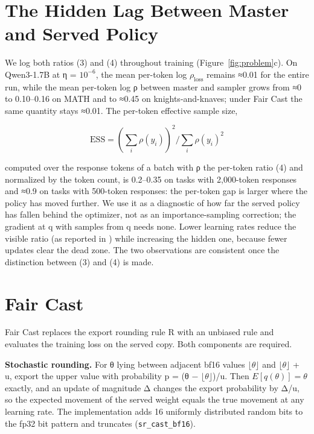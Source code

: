\documentclass[
  10pt,
]{article}
\begin{document}
\section{The Hidden Lag Between Master and Served
Policy}\label{the-hidden-lag-between-master-and-served-policy}

We log both ratios (3) and (4) throughout training (Figure~\ref{fig:problem}c). On Qwen3-1.7B at η = \(10^{-6}\),
the mean per-token \textbar log \(\rho_{\mathrm{loss}}\)\textbar{} remains ≈0.01 for the entire run,
while the mean per-token \textbar log ρ\textbar{} between master and sampler grows from ≈0 to
0.10--0.16 on MATH and to ≈0.45 on knights-and-knaves; under Fair Cast the same quantity stays
≈0.01. The per-token effective sample size,

\begin{equation}
\mathrm{ESS} = ( \sum_{i} \rho(y_{i}) )^{2} / \sum_{i} \rho(y_{i})^{2}
\end{equation}

computed over the response tokens of a batch with ρ the per-token ratio (4) and normalized by the
token count, is 0.2--0.35 on tasks with 2,000-token responses and ≈0.9 on tasks with 500-token
responses: the per-token gap is larger where the policy has moved further. We use it as a diagnostic
of how far the served policy has fallen behind the optimizer, not as an importance-sampling
correction; the gradient at q with samples from q needs none. Lower learning rates reduce the
visible ratio (as reported in \cite{r8}) while increasing the hidden one, because fewer updates
clear the dead zone. The two observations are consistent once the distinction between (3) and (4) is
made.

\section{Fair Cast}\label{fair-cast}

Fair Cast replaces the export rounding rule R with an unbiased rule and evaluates the training loss
on the served copy. Both components are required.

\textbf{Stochastic rounding.} For θ lying between adjacent bf16 values \(\lfloor \theta \rfloor\)
and \(\lfloor \theta \rfloor\) + u, export the upper value with probability p = (θ −
\(\lfloor \theta \rfloor\))/u. Then \(E[q(\theta )] = \theta\) exactly, and an update of magnitude Δ
changes the export probability by Δ/u, so the expected movement of the served weight equals the true
movement at any learning rate. The implementation adds 16 uniformly distributed random bits to the
fp32 bit pattern and truncates (\texttt{sr\_cast\_bf16}).
\end{document}
